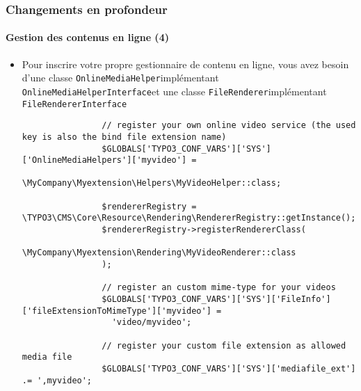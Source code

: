 \begin{frame}[fragile]
	\frametitle{Changements en profondeur}
	\framesubtitle{Gestion des contenus en ligne (4)}

	\lstset{basicstyle=\tiny\ttfamily}

	\begin{itemize}

		\item Pour inscrire votre propre gestionnaire de contenu en ligne, vous avez besoin
			d'une classe \small\texttt{OnlineMediaHelper}\normalsize\space implémentant
			\small\texttt{OnlineMediaHelperInterface}\normalsize\space et une classe
			\small\texttt{FileRenderer}\normalsize\space implémentant
			\small\texttt{FileRendererInterface}\normalsize\space

			\begin{lstlisting}
				// register your own online video service (the used key is also the bind file extension name)
				$GLOBALS['TYPO3_CONF_VARS']['SYS']['OnlineMediaHelpers']['myvideo'] =
				  \MyCompany\Myextension\Helpers\MyVideoHelper::class;

				$rendererRegistry = \TYPO3\CMS\Core\Resource\Rendering\RendererRegistry::getInstance();
				$rendererRegistry->registerRendererClass(
				  \MyCompany\Myextension\Rendering\MyVideoRenderer::class
				);

				// register an custom mime-type for your videos
				$GLOBALS['TYPO3_CONF_VARS']['SYS']['FileInfo']['fileExtensionToMimeType']['myvideo'] =
				  'video/myvideo';

				// register your custom file extension as allowed media file
				$GLOBALS['TYPO3_CONF_VARS']['SYS']['mediafile_ext'] .= ',myvideo';
			\end{lstlisting}

	\end{itemize}

\end{frame}


